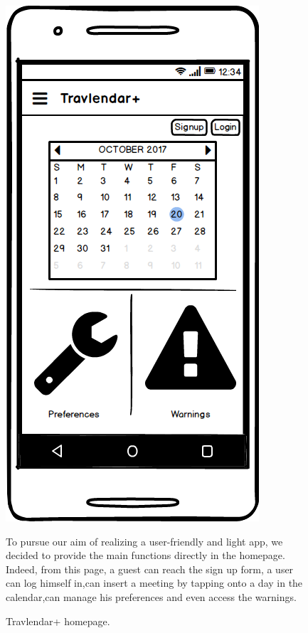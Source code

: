 
	\begin{figure}
		\centering
		\includegraphics[width=0.6\linewidth]{mockups/Homepage}
		\caption{Travlendar+ homepage.  
		}
	\label{fig:homepage}
	\begin{center}
		To pursue our aim of realizing a user-friendly and light app, we decided to provide the main functions directly in the homepage. Indeed, from this page, a guest can reach the sign up form, a user can log himself in,can insert a meeting by tapping onto a day in the calendar,can manage his preferences and even access the warnings. \\ 
	\end{center}
	\end{figure}


				
				
